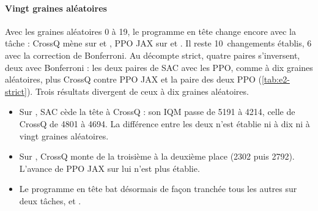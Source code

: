 
\paragraph{Vingt graines aléatoires}
Avec les graines aléatoires 0 à 19, le programme en tête change encore avec la tâche : CrossQ mène sur
 et , PPO JAX sur  et . Il reste 10~changements
établis, 6 avec la correction de Bonferroni. Au décompte strict, quatre paires s'inversent, deux avec
Bonferroni : les deux paires de SAC avec les PPO, comme à dix graines aléatoires, plus CrossQ contre PPO JAX et
la paire des deux PPO (\cref{tab:e2-strict}). Trois résultats divergent de ceux à dix graines aléatoires.
\begin{itemize}
  \item Sur , SAC cède la tête à CrossQ : son IQM passe de \num{5191} à \num{4214}, celle de
    CrossQ de \num{4801} à \num{4694}. La différence entre les deux n'est établie ni à dix ni à vingt graines
    aléatoires.
  \item Sur , CrossQ monte de la troisième à la deuxième place (\num{2302} puis \num{2792}).
    L'avance de PPO JAX sur lui n'est plus établie.
  \item Le programme en tête bat désormais de façon tranchée tous les autres sur deux tâches,
     et .
\end{itemize}

